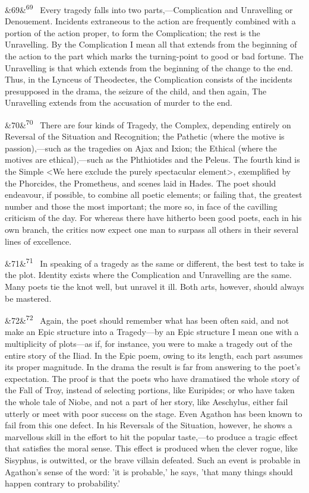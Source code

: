 \documentclass[12pt]{article}
\newcommand{\para}[1][]{\par\noindent\ifx&#1&\else\textsuperscript{\footnotesize #1}~\fi}
\begin{document}
\para[69] Every tragedy falls into two parts,---Complication and Unravelling or Denouement. Incidents extraneous to the action are frequently combined with a portion of the action proper, to form the Complication; the rest is the Unravelling. By the Complication I mean all that extends from the beginning of the action to the part which marks the turning-point to good or bad fortune. The Unravelling is that which extends from the beginning of the change to the end. Thus, in the Lynceus of Theodectes, the Complication consists of the incidents presupposed in the drama, the seizure of the child, and then again, The Unravelling extends from the accusation of murder to the end.

\para[70] There are four kinds of Tragedy, the Complex, depending entirely on Reversal of the Situation and Recognition; the Pathetic (where the motive is passion),---such as the tragedies on Ajax and Ixion; the Ethical (where the motives are ethical),---such as the Phthiotides and the Peleus. The fourth kind is the Simple <We here exclude the purely spectacular element>, exemplified by the Phorcides, the Prometheus, and scenes laid in Hades. The poet should endeavour, if possible, to combine all poetic elements; or failing that, the greatest number and those the most important; the more so, in face of the cavilling criticism of the day. For whereas there have hitherto been good poets, each in his own branch, the critics now expect one man to surpass all others in their several lines of excellence.

\para[71] In speaking of a tragedy as the same or different, the best test to take is the plot. Identity exists where the Complication and Unravelling are the same. Many poets tie the knot well, but unravel it ill. Both arts, however, should always be mastered.

\para[72] Again, the poet should remember what has been often said, and not make an Epic structure into a Tragedy---by an Epic structure I mean one with a multiplicity of plots---as if, for instance, you were to make a tragedy out of the entire story of the Iliad. In the Epic poem, owing to its length, each part assumes its proper magnitude. In the drama the result is far from answering to the poet's expectation. The proof is that the poets who have dramatised the whole story of the Fall of Troy, instead of selecting portions, like Euripides; or who have taken the whole tale of Niobe, and not a part of her story, like Aeschylus, either fail utterly or meet with poor success on the stage. Even Agathon has been known to fail from this one defect. In his Reversals of the Situation, however, he shows a marvellous skill in the effort to hit the popular taste,---to produce a tragic effect that satisfies the moral sense. This effect is produced when the clever rogue, like Sisyphus, is outwitted, or the brave villain defeated. Such an event is probable in Agathon's sense of the word: 'it is probable,' he says, 'that many things should happen contrary to probability.'
\end{document}
